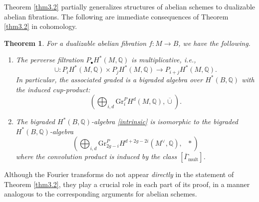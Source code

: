 \documentclass[11pt]{amsart}
\theoremstyle{plain}
\newtheorem{thm}{Theorem}[section]
\theoremstyle{definition}
\theoremstyle{remark}
\newcommand{\BQ}{{\mathbb{Q}}}
\begin{document}
Theorem \ref{thm3.2} partially generalizes structures of abelian schemes to dualizable abelian fibrations. The following are immediate consequences of Theorem \ref{thm3.2} in cohomology.

\begin{thm}\label{thm3.3}
   For a dualizable abelian fibration $f: M \to B$, we have the following.
   \begin{enumerate}
       \item[(a)] The perverse filtration $P_\bullet H^*(M, \BQ)$ is multiplicative, \emph{i.e.},
       \[
      \cup: P_iH^*(M, \BQ) \times P_{j}H^*(M, \BQ) \to P_{i+j}H^*(M, \BQ).
       \]
       In particular, the associated graded is a bigraded algebra over $H^*(B, \BQ)$ with the induced cup-product:
       \begin{equation}\label{intrinsic}
\left(       \bigoplus_{i,d} \mathrm{Gr}^P_i H^d(M, \BQ),  \overline{\cup} \right).
       \end{equation}
       \item[(b)] The bigraded $H^*(B, \BQ)$-algebra \eqref{intrinsic} is isomorphic to the bigraded $H^*(B, \BQ)$-algebra 
       \[
       \left(\bigoplus_{i,d} \mathrm{Gr}^P_{2g-i}H^{d+2g-2i}(M^\vee, \BQ), ~~~\ast \right)
       \]
       where the convolution product is induced by the class $[\overline{\Gamma}_{\mathrm{mult}}]$.
   \end{enumerate}
\end{thm}


Although the Fourier transforms do not appear \emph{directly} in the statement of Theorem \ref{thm3.2}, they play a crucial role in each part of its proof, in a manner analogous to the corresponding arguments for abelian schemes.
\end{document}
